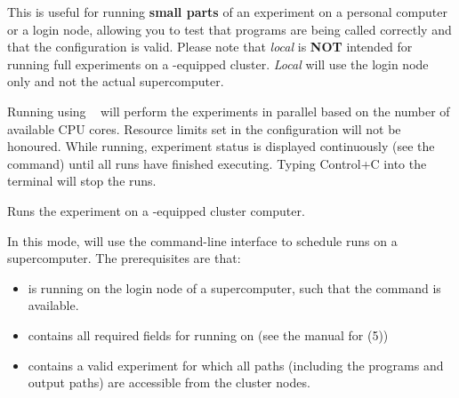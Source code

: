 \documentclass[a4paper,english]{article}
\begin{document}
\begin{adjustwidth}{18pt}{0pt}
\begin{Description}[Subcommands]
                        This is useful for running \textbf{small parts} of an experiment on
                        a personal computer or a login node, allowing you to test that programs
                        are being called correctly and that the configuration is valid.
                        Please note that \emph{local} is \textbf{NOT} intended for running full
                        experiments on a -equipped cluster.
                        \emph{Local} will use the login node only and not the actual
                        supercomputer.

                        Running using ~ will perform the experiments in
                        parallel based on the number of available CPU cores.
                        Resource limits set in the configuration will not be honoured.
                        While running, experiment status is displayed continuously (see the
                          command) until all runs have finished executing.
                        Typing Control+C into the terminal will stop the runs.

                    \item[\Arg{slurm}]
                        Runs the experiment on a -equipped cluster computer.

                        In this mode,  will use the  command-line
                        interface to schedule runs on a supercomputer.
                        The prerequisites are that:
                        \begin{itemize}
                            \item {} is running on the login node of a supercomputer, such
                                  that the  command is available.
                            \item {} contains all required fields for running on
                                   (see the manual for (5))
                            \item {} contains a valid experiment for which all
                                  paths (including the programs and output paths) are accessible
                                  from the cluster nodes.
                        \end{itemize}


\end{Description}
\end{adjustwidth}
\end{document}
